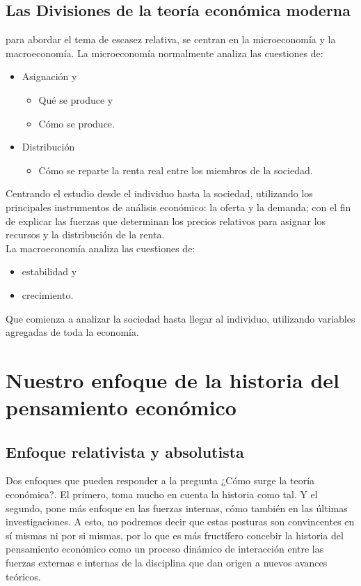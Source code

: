 \documentclass[10pt]{book}
\begin{document}
\subsection{Las Divisiones de la teoría económica moderna}
para abordar el tema de escasez relativa, se centran en la microeconomía y la macroeconomía. La microeconomía normalmente analiza las cuestiones de:
\begin{itemize}
    \item Asignación y
	\begin{itemize}
	    \item Qué se produce y
	    \item Cómo se produce.
	\end{itemize}
    \item Distribución
	\begin{itemize}
	    \item Cómo se reparte la renta real entre los miembros de la sociedad.
	\end{itemize}
\end{itemize}

Centrando el estudio desde el individuo hasta la sociedad, utilizando los principales instrumentos de análisis económico: la oferta y la demanda; con el fin de explicar las fuerzas que determinan los precios relativos para asignar los recursos y la distribución de la renta.\\

La macroeconomía analiza las cuestiones de:
\begin{itemize}
    \item estabilidad y 
    \item crecimiento.
\end{itemize}

Que comienza a analizar la sociedad hasta llegar al individuo, utilizando variables agregadas de toda la economía.


\section{Nuestro enfoque de la historia del pensamiento económico}
\subsection{Enfoque relativista y absolutista}
Dos enfoques que pueden responder a la pregunta ¿Cómo surge la teoría económica?. El primero, toma mucho en cuenta la historia como tal. Y el segundo, pone más enfoque en las fuerzas internas, cómo también en las últimas investigaciones. A esto, no podremos decir que estas posturas son convincentes en sí mismas ni por si mismas, por lo que es más fructífero concebir la historia del pensamiento económico como un proceso dinámico de interacción entre las fuerzas externas e internas de la disciplina que dan origen a nuevos avances teóricos.
\end{document}

